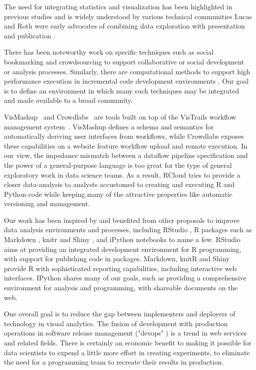 The need for integrating statistics and visualization has been
highlighted in previous studies and is widely understood by
various technical communities \cite{Perer:2008:ISA}
Lucas and Roth were early advocates of combining
data exploration with presentation and publication \cite{Lucas:1996:EIV}.

There has been noteworthy work on specific techniques such as
social bookmarking \cite{Millen:2006:DSB} \cite{Heer:2007:VAV}
and crowdsourcing \cite{Fast:2014:ECS} to support collaborative
or social development or analysis processes.
Similarly, there are computational methods to support high
performance execution in incremental code development
environments \cite{Guo:2010:TPI}.
Our goal is to define an environment in which many such
techniques may be integrated and made available to a broad community.

VisMashup~\cite{Santos:2009:VST} and Crowdlabs~\cite{Mates:2011:CSA}
are tools built on top of the VisTrails workflow management
system~\cite{Callahan:2006:VVM}. VisMashup defines a schema and
semantics for automatically deriving user interfaces from workflows,
while Crowdlabs exposes these capabilities on a website feature
workflow upload and remote execution. In our view, the impedance
mismatch between a dataflow pipeline specification and the power of a
general-purpose language is too great for the type of general
exploratory work in data science teams. As a result, RCloud tries to
provide a closer data-analysis to analysts accustomed to creating and
executing R and Python code while keeping many of the attractive
properties like automatic versioning and management.

Our work has been inspired by and benefited from other proposals
to improve data analysis environments and processes,
including RStudio \cite{RStudio:2013:SWA},
R packages such as Markdown \cite{Allaire:2014:MMR},
knitr \cite{Xie:2013:DDW}
and Shiny \cite{RStudio:2013:SWA},
and iPython notebooks \cite{Perez:2007:IAS}
to name a few. RStudio aims at providing an integrated development environment
for R programming, with support for publishing code in packages. Markdown,
knitR and Shiny provide R with sophisticated reporting capabilities, including
interactive web interfaces. IPython \cite{Perez:2007:IAS}
shares many of our goals, such as providing a comprehensive environment
for analysis and programming, with shareable documents on the web.

One overall goal is to reduce the gap between implementers and deployers
of technology in visual analytics. The fusion of development with production
operations in software release management ("devops" \cite{Httermann:2012:DD}) is a trend in web services and related fields. There is certainly an economic
benefit to making it possible for data scientists to expend a little more
effort in creating experiments, to eliminate the need for a programming
team to recreate their results in production.
